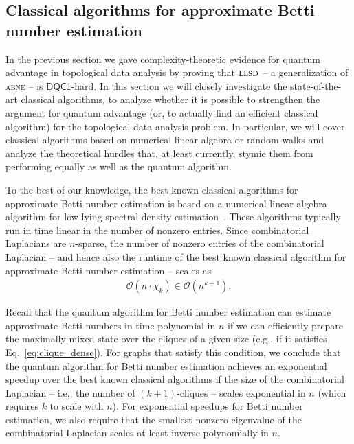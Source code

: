 \documentclass[a4paper, onecolumn, accepted=2022-08-28]{quantumarticle}
\newcommand{\bigO}[1]{\mathcal{O}\left( #1 \right)}
\begin{document}
\subsection{Classical algorithms for approximate Betti number estimation
\label{subsec:classical_algs}}

In the previous section we gave complexity-theoretic evidence for quantum advantage in topological data analysis by proving that $\textsc{llsd}$ -- a generalization of \textsc{abne} -- is $\mathsf{DQC1}$-hard.
In this section we will closely investigate the state-of-the-art classical algorithms, to analyze whether it is possible to strengthen the argument for quantum advantage (or, to actually find an efficient classical algorithm) for the topological data analysis problem.
In particular, we will cover classical algorithms based on numerical linear algebra or random walks and analyze the theoretical hurdles that, at least currently, stymie them from performing equally as well as the quantum algorithm. 

To the best of our knowledge, the best known classical algorithms for approximate Betti number estimation is based on a numerical linear algebra algorithm for low-lying spectral density estimation~\cite{ubaru:approximate_rank, cheung:rank, napoli:eigenvalue_counts, lin:spectral_density}.
These algorithms typically run in time linear in the number of nonzero entries.
Since combinatorial Laplacians are $n$-sparse, the number of nonzero entries of the combinatorial Laplacian -- and hence also the runtime of the best known classical algorithm for approximate Betti number estimation -- scales as 
\begin{align*}
    \bigO{n \cdot \chi_k} \in \bigO{n^{k+1}}.
\end{align*}

Recall that the quantum algorithm for Betti number estimation can estimate approximate Betti numbers in time polynomial in $n$ if we can efficiently prepare the maximally mixed state over the cliques of a given size (e.g., if it satisfies Eq.~\eqref{eq:clique_dense}).
For graphs that satisfy this condition, we conclude that the quantum algorithm for Betti number estimation achieves an exponential speedup over the best known classical algorithms if the size of the combinatorial Laplacian -- i.e., the number of $(k+1)$-cliques -- scales exponential in $n$ (which requires $k$ to scale with $n$).
For exponential speedups for Betti number estimation, we also require that the smallest nonzero eigenvalue of the combinatorial Laplacian scales at least inverse polynomially in $n$.
\end{document}
